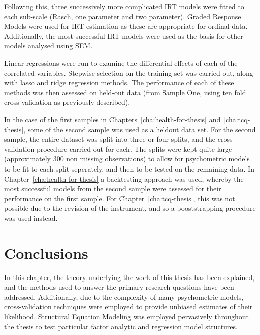 Following this, three successively more complicated IRT models were fitted to each sub-scale (Rasch, one parameter and two parameter). Graded Response Models were used for IRT estimation as these are appropriate for ordinal data. Additionally, the most successful IRT models were used as the basis for other models analysed using SEM. 


Linear regressions were run to examine the differential effects of each of the correlated variables. Stepwise selection on the training set was carried out, along with lasso and ridge  regression methods. The performance of each of these methods was then assessed on held-out data (from Sample One, using ten fold cross-validation as previously described). 

In the case of the first samples in Chapters~\ref{cha:health-for-thesis} and~\ref{cha:tcq-thesis}, some of the second sample was used as a heldout data set. For the second sample, the entire dataset was split into three or four splits, and the cross validation procedure carried out for each. The splits were kept quite large (approximately 300 non missing observations) to allow for psychometric models to be fit to each split seperately, and then to be tested on the remaining data. In Chapter~\ref{cha:health-for-thesis} a backtesting approach was used, whereby the most successful models from the second sample were assessed for their performance on the first sample. For Chapter~\ref{cha:tcq-thesis}, this was not possible due to the revision of the instrument, and so a booststrapping procedure was used instead.


\section{Conclusions}
\label{sec:conclusions}


In this chapter, the theory underlying the work of this thesis has been explained, and the methods used to answer the primary research questions have been addressed. Additionally, due to the complexity of many psychometric models, cross-validation techniques were employed to provide unbiased estimates of their likelihood. %
Structural Equation Modeling was employed pervasively throughout the thesis to test particular factor analytic and regression model structures.




